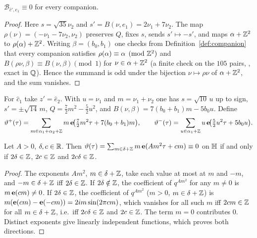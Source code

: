 \begin{proposition}\label{prop:Bcp}
$\mathcal B_{\hat c',e_1}\equiv0$ for every companion.
\end{proposition}
\begin{proof}
Here $s=\sqrt{35}\nu_2$ and $s'=B(\nu,e_1)=2\nu_1+7\nu_2$. The map $\rho(\nu)=(-\nu_1-7\nu_2,\nu_2)$ preserves $Q$, fixes $s$, sends $s'\mapsto-s'$, and maps $\alpha+\mathbb{Z}^2$ to
$\rho(\alpha)+\mathbb{Z}^2$. Writing $\beta=(b_0,b_1)$ one checks from Definition~\ref{def:companion} that every companion satisfies $\rho(\alpha)\equiv\alpha\pmod{\mathbb{Z}^2}$ and
$B(\rho\nu,\beta)\equiv B(\nu,\beta)\pmod1$ for $\nu\in\alpha+\mathbb{Z}^2$ (a finite check on the $105$ pairs, , exact in $\mathbb{Q}$). Hence the
summand is odd under the bijection $\nu\mapsto\rho\nu$ of $\alpha+\mathbb{Z}^2$, and the sum vanishes.
\end{proof}

For $\hat c_1$ take $z'=\hat e_2$. With $u=\nu_1$ and $m=\nu_1+\nu_2$ one has $s=\sqrt{10}\,u$ up to sign, $s'=\pm\sqrt{14}\,m$, $Q=\frac72m^2-\frac52u^2$, and
$B(\nu,\beta)=7(b_0+b_1)m-5b_0u$. Define
\[ \vartheta^+(\tau)=\sum_{m\in\alpha_1+\alpha_2+\mathbb{Z}}m\,\mathbf{e}\!\big(\tfrac72m^2\tau+7(b_0+b_1)m\big),\qquad
\vartheta^-(\tau)=\sum_{u\in\alpha_1+\mathbb{Z}}u\,\mathbf{e}\!\big(\tfrac52u^2\tau+5b_0u\big). \]
\begin{lemma}\label{lem:unary0}
Let $A>0$, $\delta,c\in\mathbb{R}$. Then $\vartheta(\tau)=\sum_{m\in\delta+\mathbb{Z}}m\,\mathbf{e}(Am^2\tau+cm)\equiv0$ on $\mathbb{H}$ if and only if $2\delta\in\mathbb{Z}$, $2c\in\mathbb{Z}$ and $2c\delta\in\mathbb{Z}$.
\end{lemma}
\begin{proof}
The exponents $Am^2$, $m\in\delta+\mathbb{Z}$, take each value at most at $m$ and $-m$, and $-m\in\delta+\mathbb{Z}$ iff $2\delta\in\mathbb{Z}$. If $2\delta\notin\mathbb{Z}$, the coefficient of
$q^{Am^2}$ for any $m\ne0$ is $m\,\mathbf{e}(cm)\ne0$. If $2\delta\in\mathbb{Z}$, the coefficient of $q^{Am^2}$ ($m>0$, $m\in\delta+\mathbb{Z}$) is $m(\mathbf{e}(cm)-\mathbf{e}(-cm))=2im\sin(2\pi cm)$,
which vanishes for all such $m$ iff $2cm\in\mathbb{Z}$ for all $m\in\delta+\mathbb{Z}$, i.e.\ iff $2c\delta\in\mathbb{Z}$ and $2c\in\mathbb{Z}$. The term $m=0$ contributes $0$. Distinct exponents give
linearly independent functions, which proves both directions.
\end{proof}

